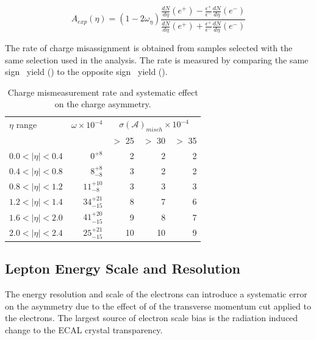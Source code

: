 \begin{equation}
  A_{exp}(\eta) = (1-2\omega_\eta)
                \frac{
                    \frac{dN}{d\eta}(e^+)-
                    \frac{\epsilon^+}{\epsilon^-}\frac{dN}{d\eta}(e^-)
                }
                {
                    \frac{dN}{d\eta}(e^+)+
                    \frac{\epsilon^+}{\epsilon^-}\frac{dN}{d\eta}(e^-)
                }
\end{equation}

The rate of charge misassignment is obtained from \Zee samples selected with
the same selection used in the analysis. The rate is measured by comparing the
same sign \PZ\ yield (\HepProcess{\PZ\to\Pepm\Pepm}) to the opposite sign \PZ\
yield (\HepProcess{\PZ\to\Pepm\Pemp}).

\begin{table}[htbp]
  \begin{center}
\begin{tabular}{lrrrr}
\toprule
$\eta$ range        & $\omega \times 10^{-4}$  & \multicolumn{3}{c}{$\sigma(\mathcal{A})_{misch}\times 10^{-4}$}\\
& & \PT $>$ 25 \GeV & \PT $>$ 30 \GeV & \PT $>$ 35 \GeV \\
\midrule
$0.0<| \eta |<0.4$  & $0^{+8}$          &  2 &  2 & 2 \\ 
$0.4<| \eta |<0.8$  & $8^{+8}_{-8}$     &  3 &  2 & 2 \\
$0.8<| \eta |<1.2$  & $11^{+10}_{-8}$   &  3 &  3 & 3 \\
$1.2<| \eta |<1.4$  & $34^{+21}_{-15}$  &  8 &  7 & 6 \\
$1.6<| \eta |<2.0$  & $41^{+20}_{-15}$  &  9 &  8 & 7 \\
$2.0<| \eta |<2.4$  & $25^{+21}_{-15}$  & 10 & 10 & 9 \\
\bottomrule
\end{tabular}
\caption{\label{tab:mischarge}Charge mismeasurement rate and systematic effect on the charge asymmetry.}
\end{center}
\end{table}

\subsection{Lepton Energy Scale and Resolution}

The energy resolution and scale of the electrons can introduce a systematic
error on the asymmetry due to the effect of of the transverse momentum cut
applied to the electrons. The largest source of electron scale bias is the
radiation induced change to the ECAL crystal transparency.

